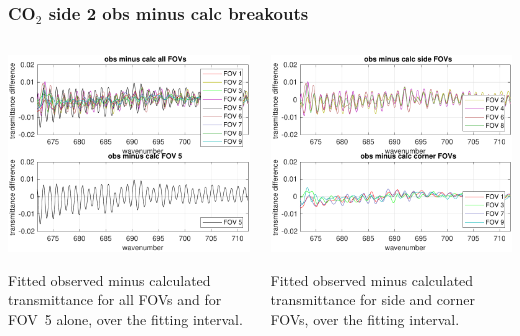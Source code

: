 \documentclass[9pt]{beamer}
\begin{document}
\begin{frame}
\frametitle{CO$_2$ side 2 obs minus calc breakouts}
\begin{columns}[t]
\begin{column}{0.5\textwidth}
  \begin{centering}
  \includegraphics[width=\textwidth]{02-05_mn_s2_CO2/CO2_breakout_1.pdf}
  \end{centering}\vspace{3mm}

Fitted observed minus calculated transmittance for all FOVs and for FOV~5
alone, over the fitting interval.

\end{column}
\begin{column}{0.5\textwidth}  
  \begin{centering}
  \includegraphics[width=\textwidth]{02-05_mn_s2_CO2/CO2_breakout_2.pdf}
  \end{centering}\vspace{3mm}

Fitted observed minus calculated transmittance for side and corner FOVs,
over the fitting interval.

\end{column}
\end{columns}
\end{frame}
\end{document}
